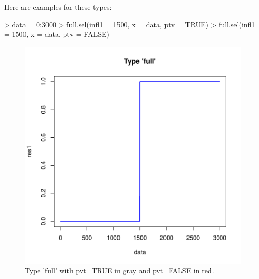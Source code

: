 \documentclass[letterpaper, 12pt]{article}
\begin{document}
Here are examples for these types:

\begin{Schunk}
\begin{Sinput}
> data = 0:3000
> full.sel(infl1 = 1500, x = data, ptv = TRUE)
> full.sel(infl1 = 1500, x = data, ptv = FALSE)
\end{Sinput}
\end{Schunk}
\begin{figure}[h]
\begin{center}
\includegraphics{relation_sel-002}
\end{center}
\caption{Type 'full' with pvt=TRUE in gray and pvt=FALSE in red.}
\label{fig1}
\end{figure}
\end{document}
